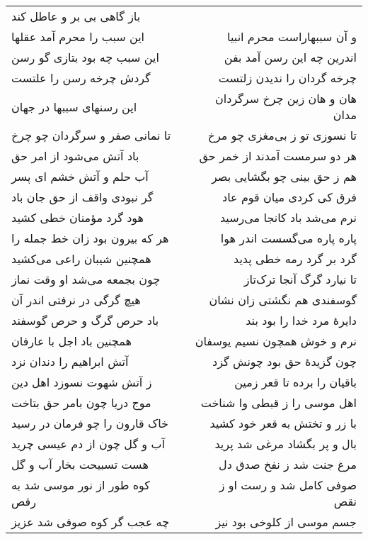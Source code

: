 \begin{center}
\begin{longtable}{l p{0.5cm} r}
باز گاهی بی بر و عاطل کند
\\
این سبب را محرم آمد عقلها
&&
و آن سببهاراست محرم انبیا
\\
این سبب چه بود بتازی گو رسن
&&
اندرین چه این رسن آمد بفن
\\
گردش چرخه رسن را علتست
&&
چرخه گردان را ندیدن زلتست
\\
این رسنهای سببها در جهان
&&
هان و هان زین چرخ سرگردان مدان
\\
تا نمانی صفر و سرگردان چو چرخ
&&
تا نسوزی تو ز بی‌مغزی چو مرخ
\\
باد آتش می‌شود از امر حق
&&
هر دو سرمست آمدند از خمر حق
\\
آب حلم و آتش خشم ای پسر
&&
هم ز حق بینی چو بگشایی بصر
\\
گر نبودی واقف از حق جان باد
&&
فرق کی کردی میان قوم عاد
\\
هود گرد مؤمنان خطی کشید
&&
نرم می‌شد باد کانجا می‌رسید
\\
هر که بیرون بود زان خط جمله را
&&
پاره پاره می‌گسست اندر هوا
\\
همچنین شیبان راعی می‌کشید
&&
گرد بر گرد رمه خطی پدید
\\
چون بجمعه می‌شد او وقت نماز
&&
تا نیارد گرگ آنجا ترک‌تاز
\\
هیچ گرگی در نرفتی اندر آن
&&
گوسفندی هم نگشتی زان نشان
\\
باد حرص گرگ و حرص گوسفند
&&
دایرهٔ مرد خدا را بود بند
\\
همچنین باد اجل با عارفان
&&
نرم و خوش همچون نسیم یوسفان
\\
آتش ابراهیم را دندان نزد
&&
چون گزیدهٔ حق بود چونش گزد
\\
ز آتش شهوت نسوزد اهل دین
&&
باقیان را برده تا قعر زمین
\\
موج دریا چون بامر حق بتاخت
&&
اهل موسی را ز قبطی وا شناخت
\\
خاک قارون را چو فرمان در رسید
&&
با زر و تختش به قعر خود کشید
\\
آب و گل چون از دم عیسی چرید
&&
بال و پر بگشاد مرغی شد پرید
\\
هست تسبیحت بخار آب و گل
&&
مرغ جنت شد ز نفخ صدق دل
\\
کوه طور از نور موسی شد به رقص
&&
صوفی کامل شد و رست او ز نقص
\\
چه عجب گر کوه صوفی شد عزیز
&&
جسم موسی از کلوخی بود نیز
\\
\end{longtable}
\end{center}
